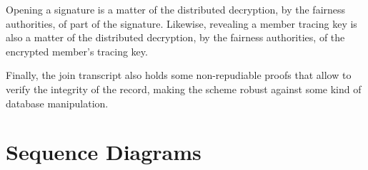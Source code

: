 \documentclass[a4paper]{article}
\begin{document}
Opening a signature is a matter of the distributed decryption, by the
fairness authorities, of part of the signature. Likewise, revealing a
member tracing key is also a matter of the distributed decryption, by
the fairness authorities, of the encrypted member's tracing key.

Finally, the join transcript also holds some non-repudiable proofs
that allow to verify the integrity of the record, making the scheme
robust against some kind of database manipulation.

\section{Sequence Diagrams}\label{seqdia}
\newcommand{\man}{\begin{tabular}{@{}c@{}}{$\circ$}\\$/|\backslash$\\$/\backslash$\\\end{tabular}}
\newcommand{\boxed}[1]{\begin{tabular}{|c|}\hline#1\\\hline\end{tabular}}
\newcommand{\mcol}[1]{\multicolumn{2}{c}{\begin{tabular}{c}#1\end{tabular}}}
\newcommand{\rarrowhead}{\hspace*{\fill}\begin{picture}(0,0)(-2,5.5)\texttt{>}\end{picture}}
\newcommand{\larrowhead}{\begin{picture}(0,0)(7,5.5)\texttt{<}\end{picture}\hspace*{\fill}}
\newcommand{\msg}[1]{{\sffamily\scriptsize$\langle$ {#1} $\rangle$}}

\end{document}
